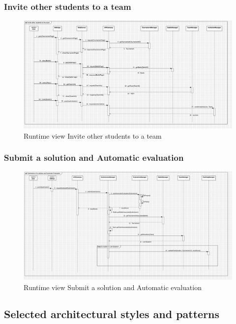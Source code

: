 \subsubsection*{Invite other students to a team}
\begin{figure}[H]
    \centering
    \includegraphics[width=\textwidth]{Diagrams/InviteStudentSD.jpg}
    \caption{Runtime view Invite other students to a team}
    \label{fig:runtime_view_invite_student}
\end{figure}

\subsubsection*{Submit a solution and Automatic evaluation}
\begin{figure}[H]
    \centering
    \includegraphics[width=\textwidth]{Diagrams/SolutionSubmissionSD.jpg}
    \caption{Runtime view Submit a solution and Automatic evaluation}
    \label{fig:runtime_view_submit_solution}
\end{figure}
\clearpage
\subsection{Selected architectural styles and patterns}
